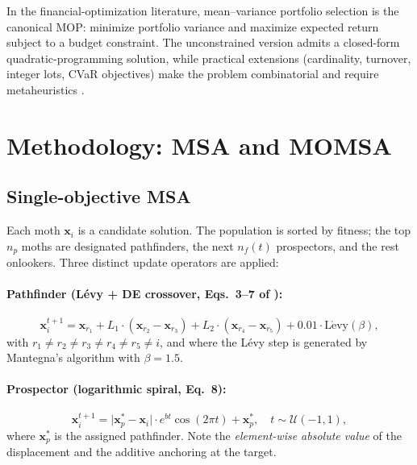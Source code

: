 \documentclass[11pt,a4paper]{article}
\begin{document}
In the financial-optimization literature, mean--variance portfolio
selection \cite{markowitz1952} is the canonical MOP: minimize portfolio
variance and maximize expected return subject to a budget constraint.
The unconstrained version admits a closed-form quadratic-programming
solution, while practical extensions (cardinality, turnover, integer
lots, CVaR objectives) make the problem combinatorial and require
metaheuristics \cite{anagnostopoulos2010portfolio}.

\section{Methodology: MSA and MOMSA}
\label{sec:method}

\subsection{Single-objective MSA}

Each moth $\mathbf{x}_i$ is a candidate solution. The population is sorted
by fitness; the top $n_p$ moths are designated pathfinders, the next
$n_f(t)$ prospectors, and the rest onlookers. Three distinct update
operators are applied:

\paragraph{Pathfinder (L\'evy + DE crossover, Eqs.~3--7 of \cite{sharifi2021momsa}):}
\begin{equation}
\mathbf{x}_i^{t+1} = \mathbf{x}_{r_1} + L_1 \cdot (\mathbf{x}_{r_2} - \mathbf{x}_{r_3})
+ L_2 \cdot (\mathbf{x}_{r_4} - \mathbf{x}_{r_5}) + 0.01 \cdot \mathrm{L\acute{e}vy}(\beta),
\label{eq:pathfinder}
\end{equation}
with $r_1 \neq r_2 \neq r_3 \neq r_4 \neq r_5 \neq i$, and where the
L\'evy step is generated by Mantegna's algorithm with $\beta = 1.5$.

\paragraph{Prospector (logarithmic spiral, Eq.~8):}
\begin{equation}
\mathbf{x}_i^{t+1} = \bigl|\mathbf{x}_{p}^\ast - \mathbf{x}_i\bigr|
\cdot e^{bt}\cos(2\pi t) + \mathbf{x}_{p}^\ast,
\quad t \sim \mathcal{U}(-1,1),
\label{eq:prospector}
\end{equation}
where $\mathbf{x}_p^\ast$ is the assigned pathfinder. Note the
\emph{element-wise absolute value} of the displacement and the additive
anchoring at the target.
\end{document}
